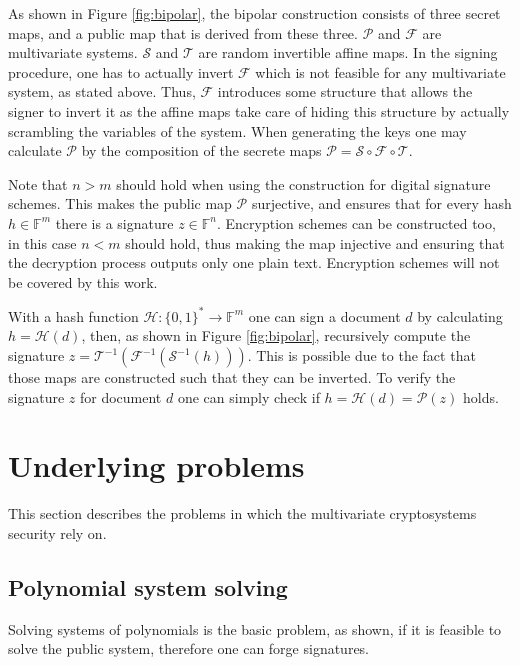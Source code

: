 \documentclass{ufsctex/ufsctex}
\begin{document}
As shown in Figure \ref{fig:bipolar}, the bipolar construction consists of
three secret maps, and a public map that is derived from these three.
$\mathcal{P}$ and $\mathcal{F}$ are multivariate systems. $\mathcal{S}$ and
$\mathcal{T}$ are random invertible affine maps. In the signing procedure, one
has to actually invert $\mathcal{F}$ which is not feasible for any multivariate
system, as stated above. Thus, $\mathcal{F}$ introduces some structure that
allows the signer to invert it as the affine maps take care of hiding this
structure by actually scrambling the variables of the system. When generating
the keys one may calculate $\mathcal{P}$ by the composition of the secrete maps
$\mathcal{P} = \mathcal{S} \circ \mathcal{F} \circ \mathcal{T}$.

Note that $n>m$ should hold when using the construction for digital signature
schemes. This makes the public map $\mathcal{P}$ surjective, and ensures that
for every hash $h \in \mathbb{F}^m$ there is a signature $z \in \mathbb{F}^n$.
Encryption schemes can be constructed too, in this case $n < m$ should hold,
thus making the map injective and ensuring that the decryption process outputs
only one plain text. Encryption schemes will not be covered by this work.

With a hash function $\mathcal{H}:\{0,1\}^* \to \mathbb{F}^m$ one can sign a
document $d$ by calculating $h = \mathcal{H}(d)$, then, as shown in Figure
\ref{fig:bipolar}, recursively compute the signature $z =
\mathcal{T}^{-1}(\mathcal{F}^{-1}(\mathcal{S}^{-1}(h)))$. This is possible due
to the fact that those maps are constructed such that they can be inverted. To
verify the signature $z$ for document $d$ one can simply check if $h =
\mathcal{H}(d) = \mathcal{P}(z)$ holds.

\section{Underlying problems}

This section describes the problems in which the multivariate cryptosystems
security rely on.

\subsection{Polynomial system solving}

Solving systems of polynomials is the basic problem, as shown, if it is
feasible to solve the public system, therefore one can forge signatures.
\end{document}
